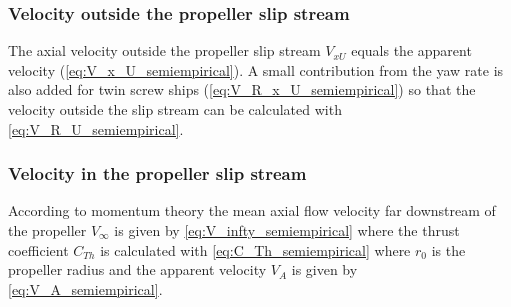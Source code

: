 \subsubsection{Velocity outside the propeller slip stream}
\label{sec:propeller_uncovered}
The axial velocity outside the propeller slip stream $V_{xU}$ equals the apparent velocity (\autoref{eq:V_x_U_semiempirical}). A small contribution from the yaw rate is also added for twin screw ships (\autoref{eq:V_R_x_U_semiempirical}) so that the velocity outside the slip stream can be calculated with \autoref{eq:V_R_U_semiempirical}.
\begin{equation}
    \label{eq:V_x_U_semiempirical}
    
\end{equation}
%
\begin{equation}
    \label{eq:V_R_x_U_semiempirical}
    
\end{equation}
%
\begin{equation}
    \label{eq:V_R_U_semiempirical}
    
\end{equation}
\subsubsection{Velocity in the propeller slip stream}
\label{sec:propeller_induced_velocity}
According to momentum theory the mean axial flow velocity far downstream of the propeller $V_{\infty}$ is given by \autoref{eq:V_infty_semiempirical} \cite{brix_manoeuvring_1993} where the thrust coefficient $C_{Th}$ is calculated with \autoref{eq:C_Th_semiempirical} where $r_0$ is the propeller radius and the apparent velocity $V_A$ is given by \autoref{eq:V_A_semiempirical}.
\begin{equation}
    \label{eq:V_infty_semiempirical}
    
\end{equation}
%
\begin{equation}
    \label{eq:C_Th_semiempirical}
    
\end{equation}
%
\begin{equation}
    \label{eq:V_A_semiempirical}
    
\end{equation}

